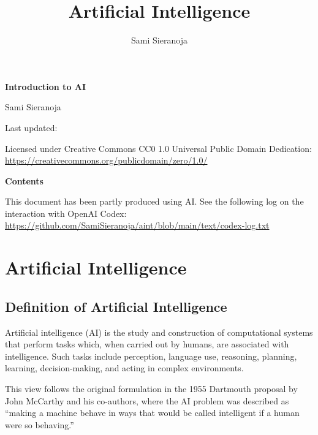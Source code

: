 \documentclass[11pt,openany,oneside]{book}
\title{Artificial Intelligence}
\author{Sami Sieranoja}
\date{}
\begin{document}
  \begin{center}
      {\LARGE\bfseries Introduction to AI\par}
       \vspace{0.3em}
      {\large Sami Sieranoja\par}
       \vspace{0.5em}
      {\small Last updated: \DTMnow\par}
      \vspace{0.5em}
      {\small Licensed under Creative Commons CC0 1.0 Universal Public Domain Dedication:
      \url{https://creativecommons.org/publicdomain/zero/1.0/}\par}
      \vspace{1em}
      {\large\bfseries Contents\par}
  \end{center}

  \vspace{0.5em}
This document has been partly produced using AI. See the following log on the interaction with OpenAI Codex: \url{https://github.com/SamiSieranoja/aint/blob/main/text/codex-log.txt}

  \vspace{0.5em}
  \makeatletter

  \makeatother




\chapter{Artificial Intelligence}

\section{Definition of Artificial Intelligence}

Artificial intelligence (AI) is the study and construction of computational
systems that perform tasks which, when carried out by humans, are associated
with intelligence. Such tasks include perception, language use, reasoning,
planning, learning, decision-making, and acting in complex environments.

This view follows the original formulation in the 1955 Dartmouth proposal by
John McCarthy and his co-authors, where the AI problem was described as
``making a machine behave in ways that would be called intelligent if a human
were so behaving.'' 
\end{document}
